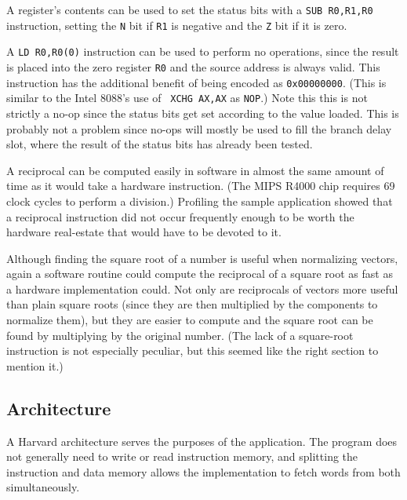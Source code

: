 \documentclass{book}
\begin{document}
\vspace{1ex}\quad A register's contents
can be used to set the
status bits with a {\tt SUB R0,R1,R0} instruction, setting the {\tt N}
bit if {\tt R1} is negative and the {\tt Z} bit if it is zero.

\vspace{1ex}\quad A {\tt LD R0,R0(0)}
instruction can be used to perform no operations, since the result is
placed into the zero register {\tt R0} and the source address is always
valid.  This instruction has the additional benefit of being encoded
as {\tt 0x00000000}.  (This is similar to the Intel 8088's use of {\tt
XCHG AX,AX} as {\tt NOP}.)  Note this this is not strictly a no-op since
the status bits get set according to the value loaded.  This is probably
not a problem since no-ops will mostly be used to fill the branch delay
slot, where the result of the status bits has already been tested.

\vspace{1ex}\quad A reciprocal can
be computed easily in software in almost the same amount of time as it
would take a hardware instruction.  (The MIPS R4000 chip requires 69
clock cycles to perform a division\cite{mips}.)  Profiling the sample
application showed that a reciprocal instruction did not occur
frequently enough to be worth the hardware real-estate that would have
to be devoted to it.

\vspace{1ex}\quad Although finding
the square root of a number is useful when normalizing vectors, again
a software routine could compute the reciprocal of a square root as
fast as a hardware implementation could.  Not only are reciprocals of
vectors more useful than plain square roots (since they are then
multiplied by the components to normalize them), but they are easier
to compute and the square root can be found by multiplying by the
original number.  (The lack of a square-root instruction is not especially
peculiar, but this seemed like the right section to mention it.)

\subsection{Architecture}

A Harvard architecture serves the purposes of the application.  The program
does not generally need to write or read instruction memory, and splitting
the instruction and data memory allows the implementation to fetch
words from both simultaneously.
\end{document}
